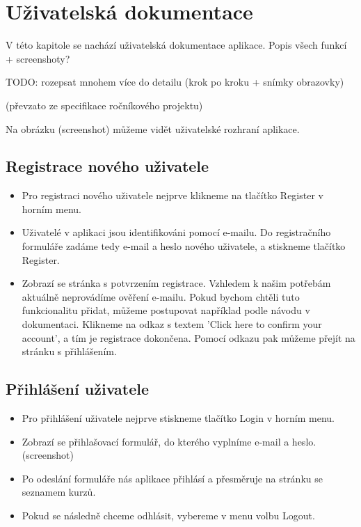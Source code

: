 \section{Uživatelská dokumentace}

V této kapitole se nachází uživatelská dokumentace aplikace.
Popis všech funkcí + screenshoty?

TODO: rozepsat mnohem více do detailu (krok po kroku + snímky obrazovky)

(převzato ze specifikace ročníkového projektu)

Na obrázku (screenshot) můžeme vidět uživatelské rozhraní aplikace.

\subsection{Registrace nového uživatele}

\begin{itemize}
	\item Pro registraci nového uživatele nejprve klikneme na tlačítko Register v horním menu.
	\item Uživatelé v aplikaci jsou identifikováni pomocí e-mailu. Do registračního formuláře zadáme tedy e-mail a heslo nového uživatele, a stiskneme tlačítko Register.
	\item Zobrazí se stránka s potvrzením registrace. Vzhledem k našim potřebám aktuálně neprovádíme ověření e-mailu. Pokud bychom chtěli tuto funkcionalitu přidat, můžeme postupovat například podle návodu v dokumentaci. \cite{AspNetCoreDocs} Klikneme na odkaz s textem 'Click here to confirm your account', a tím je registrace dokončena. Pomocí odkazu pak můžeme přejít na stránku s přihlášením.
\end{itemize}

\subsection{Přihlášení uživatele}

\begin{itemize}
	\item Pro přihlášení uživatele nejprve stiskneme tlačítko Login v horním menu.
	\item Zobrazí se přihlašovací formulář, do kterého vyplníme e-mail a heslo. (screenshot)
	\item Po odeslání formuláře nás aplikace přihlásí a přesměruje na stránku se seznamem kurzů.
	\item Pokud se následně chceme odhlásit, vybereme v menu volbu Logout.
\end{itemize}

